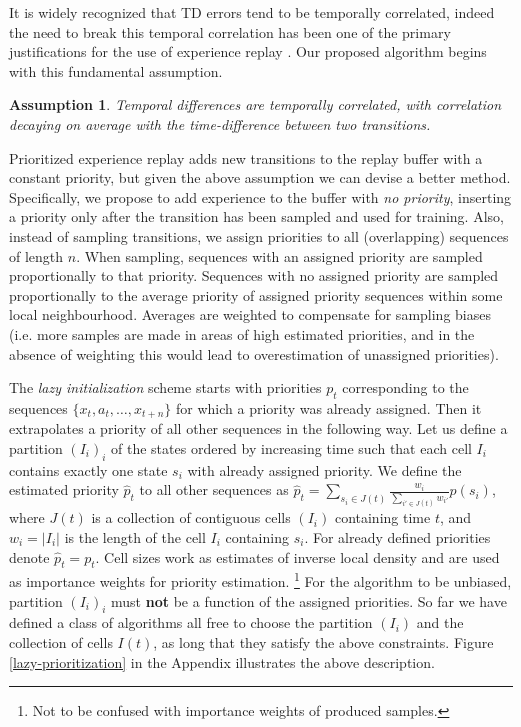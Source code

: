 \documentclass{article}
\newtheorem{assume}{Assumption}
\begin{document}
It is widely recognized that TD errors tend to be temporally correlated, indeed 
the need to 
break this temporal correlation has been one of the primary justifications for 
the use of experience replay \citep{mnih15human}. Our proposed algorithm begins 
with this fundamental assumption.
\begin{assume}
Temporal differences are temporally correlated, with correlation decaying 
on average with the time-difference between two transitions.
\end{assume}
Prioritized experience replay adds new transitions to the replay buffer with a 
constant priority, but given the above assumption we can devise a better 
method. Specifically, we propose to add experience to the buffer with 
\textit{no 
priority}, inserting a priority only after the transition has been 
sampled and used for training. Also, instead of sampling transitions, we 
assign priorities to all (overlapping) sequences of length $n$. When sampling, 
sequences with an assigned 
priority are sampled proportionally to that priority. Sequences with no 
assigned 
priority are sampled proportionally to the average priority of 
assigned priority sequences within some local neighbourhood. Averages are 
weighted to compensate for sampling biases (i.e. more samples 
are made in areas of high estimated priorities, and in the absence of 
weighting this would lead to overestimation of unassigned priorities).

The \textit{lazy initialization} 
scheme starts with priorities $p_{t}$ corresponding to the sequences
$\{x_t, a_t, \ldots, x_{t+n}\}$ for which a priority was already 
assigned. Then it extrapolates a priority of all other sequences in the 
following way. Let us define a partition $(I_i)_i$ of the states ordered by 
increasing time such that each cell $I_i$ contains exactly one state $s_i$ with 
already assigned priority. We define the estimated priority $\hat p_{t}$ to 
all other sequences as $\hat p_{t} = 
\sum_{s_i \in J(t)} \frac{w_i} {\sum_{i'\in J(t)} w_{i'}} p(s_i)$, where 
$J(t)$ is a collection of contiguous cells $(I_i)$ containing time 
$t$, and $w_i= |I_{i}|$ is the length of the cell $I_{i}$ containing $s_i$.
For already defined priorities denote $\hat p_t=p_t$. 
%
Cell sizes work as estimates of inverse local density and are 
used as importance weights for priority estimation.
\footnote{Not to be confused with importance weights of produced samples.} 
For the algorithm to be unbiased, partition $(I_i)_i$ must 
{\bf not} be a function of the assigned priorities.
So far we have defined a class of algorithms all free to choose the 
partition $(I_i)$ and the collection of cells $I(t)$, as long that they satisfy 
the above constraints. Figure 
\ref{lazy-prioritization} in the Appendix illustrates the above description.
\end{document}
